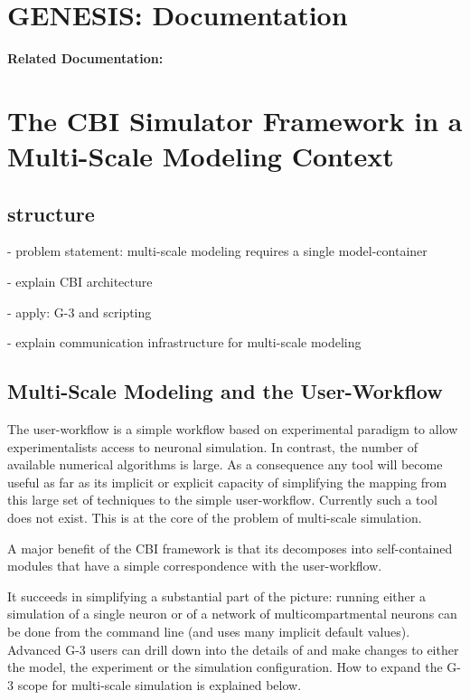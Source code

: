 \documentclass[12pt]{article}
\begin{document}
\section*{GENESIS: Documentation}

{\bf Related Documentation:}

\section*{The CBI Simulator Framework in a Multi-Scale Modeling Context}

\subsection*{structure}

- problem statement: multi-scale modeling requires a single model-container

- explain CBI architecture

- apply: G-3 and scripting

- explain communication infrastructure for multi-scale modeling


\subsection*{Multi-Scale Modeling and the User-Workflow}
The user-workflow is a simple workflow based on experimental paradigm
to allow experimentalists access to neuronal simulation.  In contrast,
the number of available numerical algorithms is large.  As a
consequence any tool will become useful as far as its implicit or
explicit capacity of simplifying the mapping from this large set of
techniques to the simple user-workflow.  Currently such a tool does
not exist.  This is at the core of the problem of multi-scale
simulation.

A major benefit of the CBI framework is that its decomposes into
self-contained modules that have a simple correspondence with the
user-workflow.

It succeeds in simplifying a substantial part of the picture: running
either a simulation of a single neuron or of a network of
multicompartmental neurons can be done from the command line (and uses
many implicit default values).  Advanced G-3 users can drill down into
the details of and make changes to either the model, the experiment or
the simulation configuration.  How to expand the G-3 scope for
multi-scale simulation is explained below.
\end{document}
